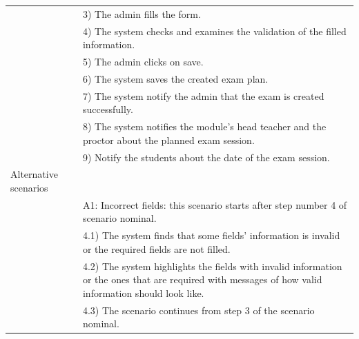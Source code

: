 \documentclass[]{uc2pfecaneva}
\begin{document}
\begin{table}[t]
\begin{tabularx}{\textwidth}{|l|X|}
            & 3) The admin fills the form.                                                                                                                                      \\
            & 4) The system checks and examines the validation of the filled information.                                                                                       \\
            & 5) The admin clicks on save.                                                                                                                                      \\
            & 6) The system saves the created exam plan.                                                                                                                     \\
            & 7) The system notify the admin that the exam is created successfully.                                                                                             \\
            & 8) The system notifies the module's head teacher and the proctor about the planned exam session.                                                                                 \\
            & 9) Notify the students about the date of the exam session.                                                                                                        \\ \hline
            Alternative scenarios &                                                                                                                                                                   \\
            & A1: Incorrect fields: this scenario starts after step number 4 of scenario nominal.                                                                               \\
            & \hspace{4mm}4.1) The system finds that some fields' information is invalid or the required fields are not filled.                                                 \\
            & \hspace{4mm}4.2) The system highlights the fields with invalid information or the ones that are required with messages of how valid information should look like. \\
            & \hspace{4mm}4.3) The scenario continues from step 3 of the scenario nominal.                                                                                      \\ \hline

\end{tabularx}
\end{table}
\end{document}
